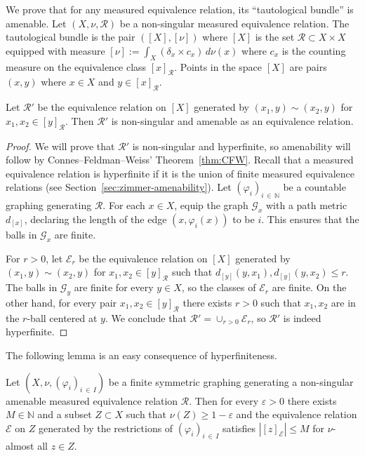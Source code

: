 \documentclass[AHL,Unicode,longabstracts,published]{cedram}
\newcommand{\bbN}{\mathbb{N}}
\newcommand{\calR}{\mathcal{R}}
\newcommand{\calE}{\mathcal{E}}
\newcommand{\calG}{\mathcal{G}}
\begin{document}
We prove that for any measured equivalence relation, its ``tautological bundle'' is amenable. Let $(X,\nu, \calR)$ be a non-singular measured equivalence relation. The tautological bundle is the pair $([X],[\nu])$ where $[X]$ is the set $\calR\subset X\times X$ equipped with measure $[\nu]:=\int_X (\delta_x\times c_x) \, d\nu(x)$ where $c_x$ is the counting measure on the equivalence class $[x]_{\calR}$. Points in the space $[X]$ are pairs $(x,y)$ where $x\in X$ and $y\in [x]_\calR.$

\begin{lemm}\label{lem:TautER}
Let $\calR'$ be the equivalence relation on $[X]$ generated by $(x_1,y)\sim (x_2,y)$ for $x_1,x_2\in [y]_{\calR}$. Then $\calR'$ is non-singular and amenable as an equivalence relation.
\end{lemm}

\begin{proof}
We will prove that $\calR'$ is non-singular and hyperfinite, so amenability will follow by Connes--Feldman--Weiss' Theorem~\ref{thm:CFW}. Recall that a measured equivalence relation is hyperfinite if it is the union of finite measured equivalence relations (see Section~\ref{sec:zimmer-amenability}). Let $(\varphi_i)_{i\,\in\,\bbN}$ be a countable graphing generating $\calR$. For each $x\in X$, equip the graph $\calG_x$ with a path metric $d_{[x]}$, declaring the length of the edge $(x,\varphi_i(x))$ to be $i$. This ensures that the balls in $\calG_x$ are finite.

For $r>0$, let $\calE_r$ be the equivalence relation on $[X]$ generated by $(x_1,y)\sim (x_2,y)$ for $x_1,x_2\in [y]_{\calR}$ such that $d_{[y]}(y,x_1),d_{[y]}(y,x_2)\leq r.$ The balls in $\calG_y$ are finite for every $y\in X$, so the classes of $\calE_r$ are finite. On the other hand, for every pair $x_1,x_2\in [y]_{\calR}$ there exists $r>0$ such that $x_1,x_2$ are in the $r$-ball centered at $y$. We conclude that $\calR'=\cup_{r>0} \calE_r$, so $\calR'$ is indeed hyperfinite.
\end{proof}

The following lemma is an easy consequence of hyperfiniteness.

\begin{lemm}\label{lem:FiniteComponents1}
Let $(X,\nu,(\varphi_i)_{i\,\in\,I})$ be a finite symmetric graphing generating a non-singular amenable measured equivalence relation $\calR$. Then for every $\varepsilon>0$ there exists $M\in \bbN$ and a subset $Z\subset X$ such that $\nu(Z)\geq 1-\varepsilon$ and the equivalence relation $\calE$ on $Z$ generated by the restrictions of $(\varphi_i)_{i\,\in\,I}$ satisfies $|[z]_{\calE}|\leq M$ for $\nu$-almost all $z\in Z$.
\end{lemm}
\end{document}
